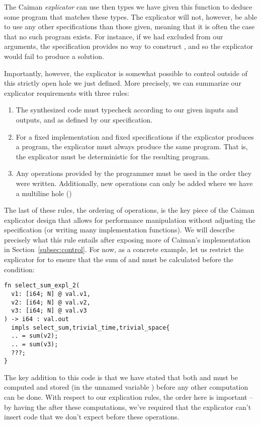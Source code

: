 The Caiman \emph{explicator} can use then types we have given this function to deduce some program that matches these types.  The explicator will not, however, be able to use any other specifications than those given, meaning that it is often the case that no such program exists.  For instance, if we had excluded  from our arguments, the  specification provides no way to construct , and so the explicator would fail to produce a solution.

Importantly, however, the explicator is somewhat possible to control outside of this strictly open  hole we just defined.  More precisely, we can summarize our explicator requirements with three rules:
%
\begin{enumerate}
\item The synthesized code must typecheck according to our given inputs and outputs, and as defined by our specification.
\item For a fixed implementation and fixed specifications if the explicator produces a program, the explicator must always produce the same program.  That is, the explicator must be deterministic for the resulting program.
\item Any operations provided by the programmer must be used in the order they were written.  Additionally, new operations can only be added where we have a multiline hole ()
\end{enumerate}
%
The last of these rules, the ordering of operations, is the key piece of the Caiman explicator design that allows for performance manipulation without adjusting the specification (or writing many implementation functions).  We will describe precisely what this rule entails after exposing more of Caiman's implementation in Section~\ref{subsec:control}.  For now, as a concrete example, let us restrict the explicator for  to ensure that the sum of  and  must be calculated before the condition:
%
\begin{lstlisting}
fn select_sum_expl_2(
  v1: [i64; N] @ val.v1,
  v2: [i64; N] @ val.v2,
  v3: [i64; N] @ val.v3
) -> i64 : val.out 
  impls select_sum,trivial_time,trivial_space{
  .. = sum(v2);
  .. = sum(v3);
  ???;
}
\end{lstlisting}
%
The key addition to this code is that we have stated that both  and  must be computed and stored (in the unnamed variable ) before any other computation can be done.  With respect to our explication rules, the order here is important -- by having the  after these computations, we've required that the explicator can't insert code that we don't expect before these operations.

